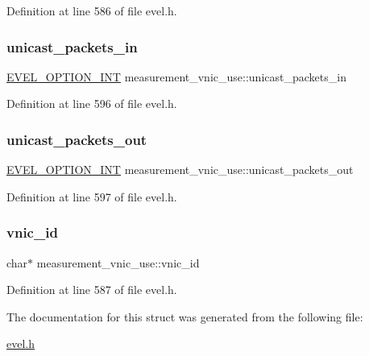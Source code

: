 Definition at line 586 of file evel.\+h.

\hypertarget{structmeasurement__vnic__use_a04f981374e31362ca9f5daad328229a5}{}\label{structmeasurement__vnic__use_a04f981374e31362ca9f5daad328229a5} 
\subsubsection{\texorpdfstring{unicast\+\_\+packets\+\_\+in}{unicast\_packets\_in}}
{\footnotesize\ttfamily \hyperlink{evel_8h_a452d825778d1c2368a54b8f689a25ba7}{E\+V\+E\+L\+\_\+\+O\+P\+T\+I\+O\+N\+\_\+\+I\+NT} measurement\+\_\+vnic\+\_\+use\+::unicast\+\_\+packets\+\_\+in}



Definition at line 596 of file evel.\+h.

\hypertarget{structmeasurement__vnic__use_a4a4cd7bddd52b0363a3e25b4ee18444c}{}\label{structmeasurement__vnic__use_a4a4cd7bddd52b0363a3e25b4ee18444c} 
\subsubsection{\texorpdfstring{unicast\+\_\+packets\+\_\+out}{unicast\_packets\_out}}
{\footnotesize\ttfamily \hyperlink{evel_8h_a452d825778d1c2368a54b8f689a25ba7}{E\+V\+E\+L\+\_\+\+O\+P\+T\+I\+O\+N\+\_\+\+I\+NT} measurement\+\_\+vnic\+\_\+use\+::unicast\+\_\+packets\+\_\+out}



Definition at line 597 of file evel.\+h.

\hypertarget{structmeasurement__vnic__use_a2fd8f65f55f741c4c032ba2e6bda2da9}{}\label{structmeasurement__vnic__use_a2fd8f65f55f741c4c032ba2e6bda2da9} 
\subsubsection{\texorpdfstring{vnic\+\_\+id}{vnic\_id}}
{\footnotesize\ttfamily char$\ast$ measurement\+\_\+vnic\+\_\+use\+::vnic\+\_\+id}



Definition at line 587 of file evel.\+h.



The documentation for this struct was generated from the following file\+:\begin{DoxyCompactItemize}
\item 
\hyperlink{evel_8h}{evel.\+h}\end{DoxyCompactItemize}
